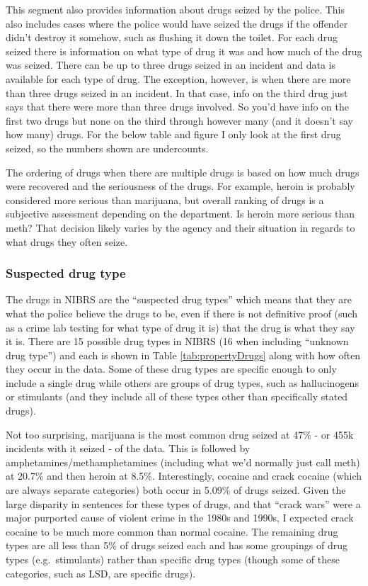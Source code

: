 \documentclass[
  12pt,
  openany]{book}
\begin{document}
This segment also provides information about drugs seized by the police. This also includes cases where the police would have seized the drugs if the offender didn't destroy it somehow, such as flushing it down the toilet. For each drug seized there is information on what type of drug it was and how much of the drug was seized. There can be up to three drugs seized in an incident and data is available for each type of drug. The exception, however, is when there are more than three drugs seized in an incident. In that case, info on the third drug just says that there were more than three drugs involved. So you'd have info on the first two drugs but none on the third through however many (and it doesn't say how many) drugs. For the below table and figure I only look at the first drug seized, so the numbers shown are undercounts.

The ordering of drugs when there are multiple drugs is based on how much drugs were recovered and the seriousness of the drugs. For example, heroin is probably considered more serious than marijuana, but overall ranking of drugs is a subjective assessment depending on the department. Is heroin more serious than meth? That decision likely varies by the agency and their situation in regards to what drugs they often seize.

\hypertarget{suspected-drug-type}{%
\subsubsection{Suspected drug type}\label{suspected-drug-type}}

The drugs in NIBRS are the ``suspected drug types'' which means that they are what the police believe the drugs to be, even if there is not definitive proof (such as a crime lab testing for what type of drug it is) that the drug is what they say it is. There are 15 possible drug types in NIBRS (16 when including ``unknown drug type'') and each is shown in Table \ref{tab:propertyDrugs} along with how often they occur in the data. Some of these drug types are specific enough to only include a single drug while others are groups of drug types, such as hallucinogens or stimulants (and they include all of these types other than specifically stated drugs).

Not too surprising, marijuana is the most common drug seized at 47\% - or 455k incidents with it seized - of the data. This is followed by amphetamines/methamphetamines (including what we'd normally just call meth) at 20.7\% and then heroin at 8.5\%. Interestingly, cocaine and crack cocaine (which are always separate categories) both occur in 5.09\% of drugs seized. Given the large disparity in sentences for these types of drugs, and that ``crack wars'' were a major purported cause of violent crime in the 1980s and 1990s, I expected crack cocaine to be much more common than normal cocaine. The remaining drug types are all less than 5\% of drugs seized each and has some groupings of drug types (e.g.~stimulants) rather than specific drug types (though some of these categories, such as LSD, are specific drugs).
\end{document}
